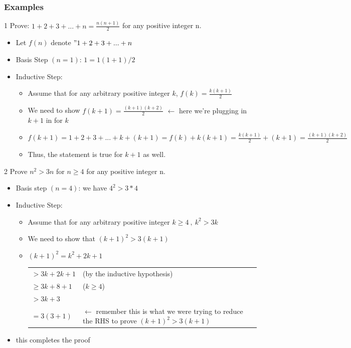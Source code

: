 \documentclass[12pt, letterpaper]{article}
\newcommand{\exheader}[1][ex]{{\tiny{#1}\normalsize}}
\begin{document}
\pagebreak

\subsubsection{Examples}

\exheader[1] Prove: $1 + 2 + 3 + ... + n = \frac{n(n+1)}{2}$ for any positive integer n.
\begin{itemize}[label={}, leftmargin=0.8cm]
	\item Let $f(n)$ denote $"1+2+3+...+n $
	\item Basis Step $(n=1)$: $ 1 = 1(1+1)/2$ \textcolor{green}{\checkmark}
	\item Inductive Step:
	\begin{itemize}
		\item Assume that for any arbitrary positive integer $k$, $f(k) = \frac{k(k+1)}{2}$
		\item We need to show $f(k+1) = \frac{(k+1)(k+2)}{2}$ {\tiny $\leftarrow$ here we're plugging in $k+1$ in for $k$}
		\item $f(k+1) = 1 + 2 + 3 + ... + k + (k+1) = f(k) + k(k+1) = \frac{k(k+1)}{2} + (k+1) = \frac{(k+1)(k+2)}{2}$
		\item Thus, the statement is true for $k+1$ as well.
	\end{itemize}
\end{itemize}

\bigbreak

\exheader[2] Prove $n^2 > 3n$ for $n \ge 4$ for any positive integer n.
\begin{itemize}
	\item Basis step $(n=4)$: we have $4^2 > 3*4$ \textcolor{green}{\checkmark}
	\item Inductive Step:
	\begin{itemize}
		\item Assume that for any arbitrary positive integer $k \ge 4 \ , \ k^2 > 3k$
		\item We need to show that $(k+1)^2 > 3(k+1)$
		\item $(k+1)^2 = k^2 + 2k + 1$ \\
		\begin{tabular}{l l}
			$> 3k + 2k + 1$ & (by the inductive hypothesis) \\
			$\ge 3k + 8 + 1$ & ($k \ge 4$) \\
			$> 3k + 3$ & \\
			$=3(3+1)$ & {\tiny $\leftarrow$ remember this is what we were trying to reduce the RHS to prove $(k+1)^2 > 3(k+1)$}
		\end{tabular}
	\end{itemize}
	\item this completes the proof
\end{itemize}
\end{document}
